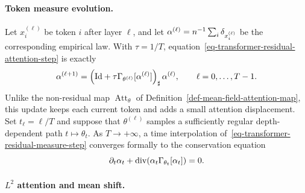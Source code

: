 \paragraph{Token measure evolution.}

Let \(x_i^{(\ell)}\) be token \(i\) after layer \(\ell\), and let \(\alpha^{(\ell)}=n^{-1}\sum_i\delta_{x_i^{(\ell)}}\) be the corresponding empirical law. With \(\tau=1/T\), equation~\eqref{eq-transformer-residual-attention-step} is exactly
\begin{equation}\label{eq-transformer-residual-measure-step}
	\alpha^{(\ell+1)}
	=
	\left(
		\mathrm{Id}+\tau\Gamma_{\theta^{(\ell)}}[\alpha^{(\ell)}]
	\right)_\sharp
	\alpha^{(\ell)},
	\qquad
	\ell=0,\ldots,T-1.
\end{equation}
Unlike the non-residual map \(\operatorname{Att}_\theta\) of Definition~\ref{def-mean-field-attention-map}, this update keeps each current token and adds a small attention displacement.
Set \(t_\ell=\ell/T\) and suppose that \(\theta^{(\ell)}\) samples a sufficiently regular depth-dependent path \(t\mapsto\theta_t\). As \(T\to+\infty\), a time interpolation of~\eqref{eq-transformer-residual-measure-step} converges formally to the conservation equation
\begin{equation*}
	\partial_t\alpha_t
	+
	\operatorname{div}\!\left(\alpha_t\Gamma_{\theta_t}[\alpha_t]\right)
	=
	0.
\end{equation*}



\paragraph{$L^2$ attention and mean shift.}

